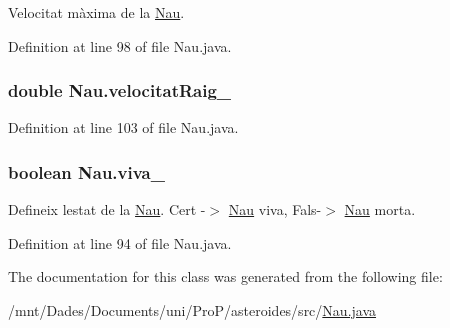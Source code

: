 Velocitat màxima de la \hyperlink{class_nau}{Nau}. 



Definition at line 98 of file Nau.\+java.

\hypertarget{class_nau_a1400505da3bafa2056c8e542a7811b33}{}
\subsubsection[{velocitat\+Raig\+\_\+}]{\setlength{\rightskip}{0pt plus 5cm}double Nau.\+velocitat\+Raig\+\_\+\hspace{0.3cm}{\ttfamily [protected]}}\label{class_nau_a1400505da3bafa2056c8e542a7811b33}


Definition at line 103 of file Nau.\+java.

\hypertarget{class_nau_a165d7613744bb71f472d6bc56aa65540}{}
\subsubsection[{viva\+\_\+}]{\setlength{\rightskip}{0pt plus 5cm}boolean Nau.\+viva\+\_\+\hspace{0.3cm}{\ttfamily [private]}}\label{class_nau_a165d7613744bb71f472d6bc56aa65540}


Defineix l\textquotesingle{}estat de la \hyperlink{class_nau}{Nau}. Cert -\/$>$ \hyperlink{class_nau}{Nau} viva, Fals-\/$>$ \hyperlink{class_nau}{Nau} morta. 



Definition at line 94 of file Nau.\+java.



The documentation for this class was generated from the following file\+:\begin{DoxyCompactItemize}
\item 
/mnt/\+Dades/\+Documents/uni/\+Pro\+P/asteroides/src/\hyperlink{_nau_8java}{Nau.\+java}\end{DoxyCompactItemize}
